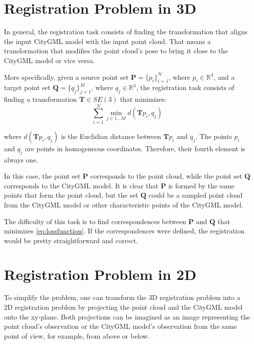     \section{Registration Problem in 3D}
    \label{section:Registration Problem in 3D}
        In general, the registration task consists of finding the transformation that aligns the input CityGML model with the input point cloud.
        That means a transformation that modifies the point cloud’s pose to bring it close to the CityGML model or vice versa.
        
        More specifically, given a source point set $\pmb{P} = \{p_i\}_{i=1}^N$, where $p_i \in \mathbb {R}^{4}$,
        and a target point set $\pmb{Q} = \{q_j\}_{j=1}^M$, where $q_j \in \mathbb {R}^{4}$,
        the registration task consists of finding a transformation $\pmb{T} \in SE(3)$ that minimizes:
        \begin{equation}
            \label{eq:lossfunction}
            \sum_{i = 1}^{N} \min_{j \in {1...M}} d( \pmb{T} p_i , q_j )    
        \end{equation}
          
        where $d(\pmb{T} p_i, q_j)$ is the Euclidian distance between $\pmb{T} p_i$ and $q_j$.
        The points $p_i$ and $q_j$ are points in homogeneous coordinates. Therefore, their fourth element is always one.

        In this case, the point set $\pmb{P}$ corresponds to the point cloud, while the point set $\pmb{Q}$ corresponds to the CityGML model.
        It is clear that $\pmb{P}$ is formed by the same points that form the point cloud, 
        but the set $\pmb{Q}$ could be a sampled point cloud from the CityGML model
        or other characteristic points of the CityGML model.
        
        The difficulty of this task is to find correspondences between $\pmb{P}$ and $\pmb{Q}$ that minimizes \autoref{eq:lossfunction}.
        If the correspondences were defined, the registration would be pretty straightforward and correct.

    \section{Registration Problem in 2D}
    \label{section:Registration Problem in 2D}
        To simplify the problem, one can transform the 3D registration problem into a 2D registration problem 
        by projecting the point cloud and the CityGML model onto the xy-plane.
        Both projections can be imagined as an image representing the point cloud’s observation
        or the CityGML model’s observation from the same point of view, for example, from above or below.

